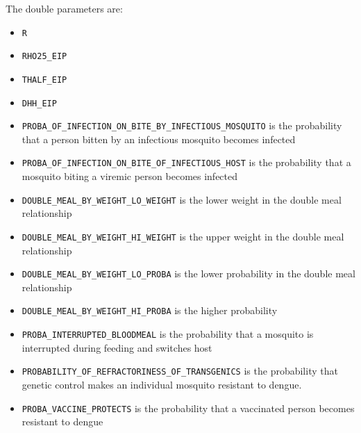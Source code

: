 \documentclass[11pt]{article}
\newcommand{\linecmd}[1]{\texttt{#1}}
\begin{document}
The double parameters are:
\begin{itemize}
	\item \linecmd{R}
	\item \linecmd{RHO25\_EIP} 
	\item \linecmd{THALF\_EIP} 
	\item \linecmd{DHH\_EIP} 
	\item \linecmd{PROBA\_OF\_INFECTION\_ON\_BITE\_BY\_INFECTIOUS\_MOSQUITO} is the probability that a person bitten by an infectious mosquito becomes infected
	\item \linecmd{PROBA\_OF\_INFECTION\_ON\_BITE\_OF\_INFECTIOUS\_HOST} is the probability that a mosquito biting a viremic person becomes infected
	\item \linecmd{DOUBLE\_MEAL\_BY\_WEIGHT\_LO\_WEIGHT} is the lower weight in the double meal relationship
	\item \linecmd{DOUBLE\_MEAL\_BY\_WEIGHT\_HI\_WEIGHT} is the upper weight in the double meal relationship
	\item \linecmd{DOUBLE\_MEAL\_BY\_WEIGHT\_LO\_PROBA}  is the lower probability in the double meal relationship
	\item \linecmd{DOUBLE\_MEAL\_BY\_WEIGHT\_HI\_PROBA} is the higher probability
	\item \linecmd{PROBA\_INTERRUPTED\_BLOODMEAL} is the probability that a mosquito is interrupted during feeding and switches host
	\item \linecmd{PROBABILITY\_OF\_REFRACTORINESS\_OF\_TRANSGENICS} is the probability that genetic control makes an individual mosquito resistant to dengue.
	\item \linecmd{PROBA\_VACCINE\_PROTECTS} is the probability that a vaccinated person becomes resistant to dengue
	

\end{itemize}
\end{document}
